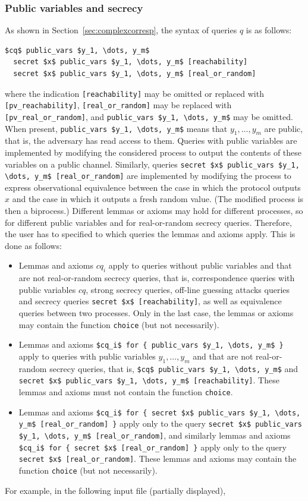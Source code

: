 \documentclass{book}
\begin{document}
\subsubsection{Public variables and secrecy}

As shown in Section~\ref{sec:complexcorresp}, the syntax of queries $q$ is as follows:
\begin{lstlisting}[numbers=none]
  $cq$ public_vars $y_1, \dots, y_m$
  secret $x$ public_vars $y_1, \dots, y_m$ [reachability]
  secret $x$ public_vars $y_1, \dots, y_m$ [real_or_random]
\end{lstlisting}
%
where the indication \lstinline![reachability]! may be omitted or replaced with \lstinline![pv_reachability]!,
\lstinline![real_or_random]! may be replaced with \lstinline![pv_real_or_random]!, and
\lstinline!public_vars $y_1, \dots, y_m$! may be omitted. When present, \lstinline!public_vars $y_1, \dots, y_m$! means that $y_1, \dots, y_m$ are public, that is, the adversary has read access to them.
Queries with public variables are implemented by modifying the considered process to output the contents of these variables on a public channel.
Similarly, queries \lstinline!secret $x$ public_vars $y_1, \dots, y_m$ [real_or_random]! are implemented by modifying the process to express observational equivalence between the case in which the protocol outputs $x$ and the case in which it outputs a fresh random value. (The modified process is then a biprocess.)
Different lemmas or axioms may hold for different processes, so for different public variables and for real-or-random secrecy queries. Therefore, the user has to specified to which queries the lemmas and axioms apply. This is done as follows:
\begin{itemize}
	\item Lemmas and axioms $cq_i$ apply to queries without public variables and that are not real-or-random secrecy queries, that is, correspondence queries with public variables $cq$, strong secrecy queries, off-line guessing attacks queries and secrecy queries \lstinline!secret $x$ [reachability]!, as well as equivalence queries between two processes. Only in the last case, the lemmas or axioms may contain the function \lstinline!choice! (but not necessarily).
	\item Lemmas and axioms \lstinline!$cq_i$ for { public_vars $y_1, \dots, y_m$ }! apply to queries with public variables $y_1, \dots, y_m$ and that are not real-or-random secrecy queries, that is, \lstinline!$cq$ public_vars $y_1, \dots, y_m$! and
        \lstinline!secret $x$ public_vars $y_1, \dots, y_m$ [reachability]!. These lemmas and axioms must not contain the function \lstinline!choice!.
	\item Lemmas and axioms \lstinline!$cq_i$ for { secret $x$ public_vars $y_1, \dots, y_m$ [real_or_random] }! apply only to the query  \lstinline!secret $x$ public_vars $y_1, \dots, y_m$ [real_or_random]!, and similarly lemmas and axioms \lstinline!$cq_i$ for { secret $x$ [real_or_random] }! apply only to the query  \lstinline!secret $x$ [real_or_random]!. These lemmas and axioms may contain the function \lstinline!choice! (but not necessarily).
\end{itemize}
For example, in the following input file (partially displayed),
\end{document}
